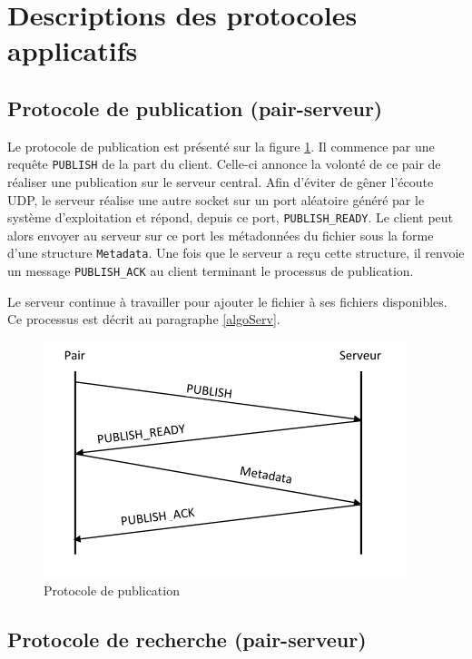 \section{Descriptions des protocoles applicatifs}
\subsection{Protocole de publication (pair-serveur)}

Le protocole de publication est présenté sur la figure \ref{publish}. Il commence par une requête \texttt{PUBLISH} de la part du client. Celle-ci annonce la volonté 
de ce pair de réaliser une publication sur le serveur central. Afin d'éviter de gêner l'écoute UDP, le serveur réalise une autre socket sur un port aléatoire généré 
par le système d'exploitation et répond, depuis ce port, \texttt{PUBLISH\_READY}. Le client peut alors envoyer au serveur sur ce port les métadonnées du fichier 
sous la forme d'une structure \texttt{Metadata}. Une fois que le serveur a reçu cette structure, il renvoie un message \texttt{PUBLISH\_ACK} au client terminant 
le processus de publication.

Le serveur continue à travailler pour ajouter le fichier à ses fichiers disponibles. Ce processus est décrit au paragraphe \ref{algoServ}.

\begin{figure}
	\begin{center}
		\includegraphics[scale=1]{Publish.png}
	\end{center}
	\caption{Protocole de publication}
	\label{publish}
\end{figure}

\subsection{Protocole de recherche (pair-serveur)}

